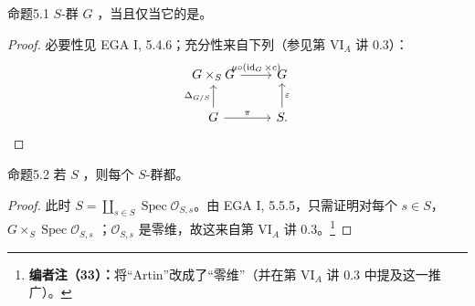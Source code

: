 \begin{SGAresult}{命题}{5.1}
$S$-群 $G$ ，当且仅当它的是。
\end{SGAresult}
\begin{proof}
必要性见 EGA I, 5.4.6；充分性来自下列（参见第 VI$_A$ 讲 0.3）：
\[
\begin{tikzcd}
G\times_SG\arrow[r,"{\mu\circ(\operatorname{id}_G\times c)}"]&G\\
G\arrow[u,"\Delta_{G/S}"]\arrow[r,"\pi"]&S\arrow[u,"\varepsilon"'].
\end{tikzcd}
\]
\end{proof}
\begin{SGAresult}{命题}{5.2}
若 $S$ ，则每个 $S$-群都。
\end{SGAresult}
\begin{proof}
此时 $S=\coprod_{s\in S}\operatorname{Spec}\mathcal O_{S,s}$。由 EGA I, 5.5.5，只需证明对每个 $s\in S$，$G\times_S\operatorname{Spec}\mathcal O_{S,s}$ ；$\mathcal O_{S,s}$ 是零维，故这来自第 VI$_A$ 讲 0.3。\footnote{\textbf{编者注（33）：}将“Artin”改成了“零维”（并在第 VI$_A$ 讲 0.3 中提及这一推广）。}
\end{proof}
